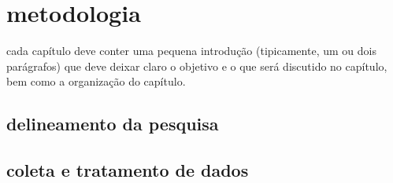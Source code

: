 
\chapter{metodologia}
\label{chap:metodologia}
cada capítulo deve conter uma pequena introdução (tipicamente, um ou dois parágrafos) que deve deixar claro o objetivo e 
o que será discutido no capítulo, bem como a organização do capítulo.

\section{delineamento da pesquisa}
\label{sec:titsecdelpesq}

\section{coleta e tratamento de dados}
\label{sec:titseccoldad}
